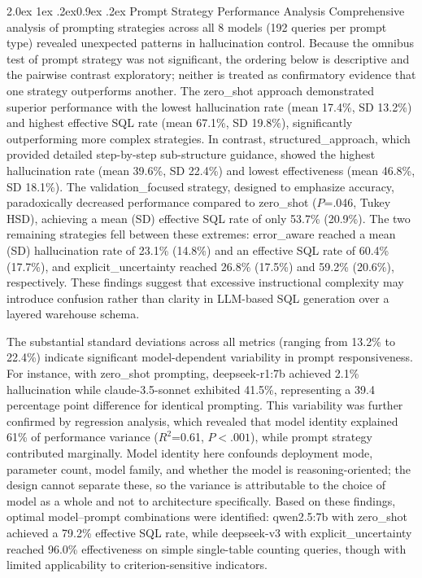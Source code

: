 \documentclass[10pt]{article}
\makeatletter
\renewcommand\subsection{\@startsection{subsection}{2}{\z@}%
  {2.0ex \@plus 1ex \@minus .2ex}{0.9ex \@plus .2ex}%
  {\normalfont\normalsize\bfseries}}
\makeatother
\begin{document}
\subsection{Prompt Strategy Performance Analysis}
Comprehensive analysis of prompting strategies across all 8 models (192 queries
per prompt type) revealed unexpected patterns in hallucination control. Because the omnibus test of prompt strategy was not significant, the ordering below is descriptive and the pairwise contrast exploratory; neither is treated as confirmatory evidence that one strategy outperforms another. The
zero\_shot approach demonstrated superior performance with the lowest
hallucination rate (mean 17.4\%, SD 13.2\%) and highest effective SQL rate (mean 67.1\%, SD 19.8\%), significantly outperforming more complex strategies. In
contrast, structured\_approach, which provided detailed step-by-step
sub-structure guidance, showed the highest hallucination rate (mean 39.6\%, SD 22.4\%) and lowest effectiveness (mean 46.8\%, SD 18.1\%). The
validation\_focused strategy, designed to emphasize accuracy, paradoxically
decreased performance compared to zero\_shot ($P$=.046, Tukey HSD), achieving a mean (SD) effective SQL rate of only 53.7\% (20.9\%). The two remaining
strategies fell between these extremes: error\_aware reached a mean (SD) hallucination rate of 23.1\% (14.8\%) and an effective SQL rate of 60.4\% (17.7\%), and explicit\_uncertainty reached 26.8\% (17.5\%) and 59.2\% (20.6\%), respectively. These findings suggest
that excessive instructional complexity may introduce confusion rather than
clarity in LLM-based SQL generation over a layered warehouse schema.

The substantial standard deviations across all metrics (ranging from 13.2\% to 22.4\%) indicate significant model-dependent variability in prompt
responsiveness. For instance, with zero\_shot prompting, deepseek-r1:7b achieved 2.1\% hallucination while claude-3.5-sonnet exhibited 41.5\%, representing a 39.4 percentage point difference for identical prompting. This variability was
further confirmed by regression analysis, which revealed that model identity
explained 61\% of performance variance ($R^2$=0.61, $P<.001$), while prompt strategy contributed marginally. Model identity here confounds deployment mode, parameter count, model family, and whether the model is reasoning-oriented; the design cannot separate these, so the variance is attributable to the choice of model as a whole and not to architecture specifically. Based on these findings, optimal model--prompt
combinations were identified: qwen2.5:7b with zero\_shot achieved a 79.2\% effective SQL rate, while deepseek-v3 with explicit\_uncertainty reached 96.0\% effectiveness on simple single-table counting queries, though with limited
applicability to criterion-sensitive indicators.
\end{document}
